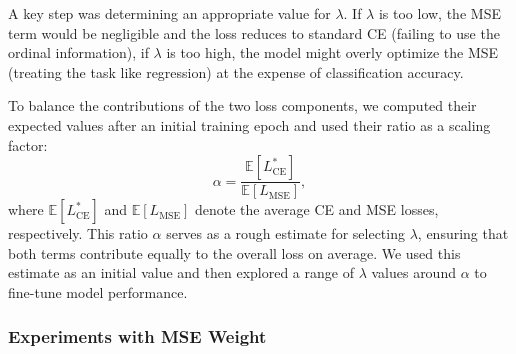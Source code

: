 A key step was determining an appropriate value for $\lambda$. If $\lambda$ is too low, the \ac{MSE} term would be negligible and the loss reduces to standard \ac{CE} (failing to use the ordinal information), if $\lambda$ is too high, the model might overly optimize the \ac{MSE} (treating the task like regression) at the expense of classification accuracy. 

To balance the contributions of the two loss components, we computed their expected values after an initial training epoch and used their ratio as a scaling factor:
\begin{equation}
\alpha = \frac{\mathbb{E}[L_{\mathrm{CE}}^{*}]}{\mathbb{E}[L_{\mathrm{MSE}}]},
\end{equation}
where $\mathbb{E}[L_{\mathrm{CE}}^{*}]$ and $\mathbb{E}[L_{\mathrm{MSE}}]$ denote the average \ac{CE} and \ac{MSE} losses, respectively. This ratio $\alpha$ serves as a rough estimate for selecting $\lambda$, ensuring that both terms contribute equally to the overall loss on average. We used this estimate as an initial value and then explored a range of $\lambda$ values around $\alpha$ to fine-tune model performance.

\subsubsection*{Experiments with \ac{MSE} Weight} 

